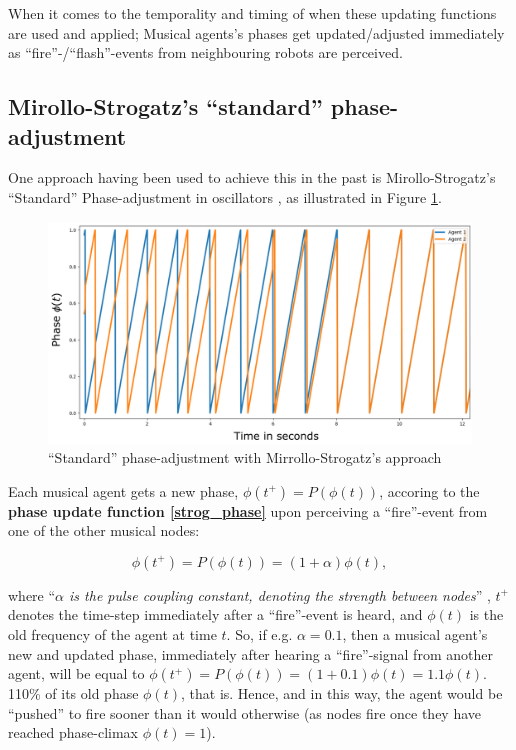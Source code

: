	When it comes to the temporality and timing of when these updating functions are used and applied; Musical agents's phases get updated/adjusted immediately as ``fire''-/``flash''-events from neighbouring robots are perceived.

	
	
	\subsection{Mirollo-Strogatz's ``standard'' phase-adjustment} %
	
	One approach having been used to achieve this in the past is Mirollo-Strogatz's ``Standard'' Phase-adjustment in oscillators \cite{mirollo_strogatz_PCO_synch}, as illustrated in Figure \ref{fig:strog_phase}.
			
	\begin{figure}[h]
		\centering
		\includegraphics[width=0.9\linewidth]{Assets/Figures/MirolloStrogatzPhaseAdjustmentSecondTry.pdf}
		\caption{``Standard'' phase-adjustment with Mirrollo-Strogatz's approach}
		\label{fig:strog_phase}
	\end{figure}
	
	Each musical agent gets a new phase, $\phi(t^+) = P(\phi(t))$, accoring to the \textbf{phase update function \eqref{strog_phase}} upon perceiving a ``fire''-event from one of the other musical nodes:
	
	\begin{equation}\label{strog_phase}
	\phi(t^+) = P(\phi(t)) = (1 + \alpha)\phi(t)	,
	\end{equation}
	
	where ``\textit{$\alpha$ is the pulse coupling constant, denoting the strength between nodes}'' \cite{nymoen_synch}, $t^+$ denotes the time-step immediately after a ``fire''-event is heard, and $\phi(t)$ is the old frequency of the agent at time $t$. So, if e.g. $\alpha = 0.1$, then a musical agent's new and updated phase, immediately after hearing a ``fire''-signal from another agent, will be equal to $\phi(t^+) = P(\phi(t)) = (1 + 0.1)\phi(t) = 1.1\phi(t)$. 110\% of its old phase $\phi(t)$, that is. Hence, and in this way, the agent would be ``pushed'' to fire sooner than it would otherwise (as nodes fire once they have reached phase-climax $\phi(t)=1$).
		
